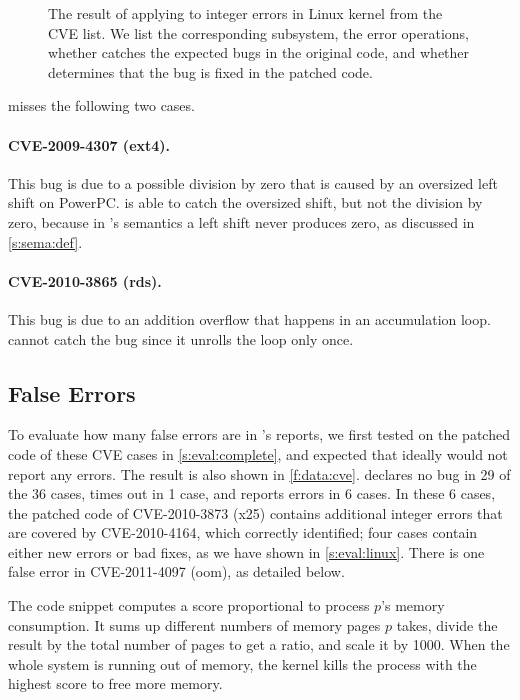 \begin{figure*}
\centering
\footnotesize

\caption{The result of applying \sys to integer errors in Linux
kernel from the CVE list.  We list the corresponding
subsystem, the error operations, whether \sys catches the expected
bugs in the original code, and whether \sys determines that the bug
is fixed in the patched code.}
\label{f:data:cve}
\end{figure*}

\sys misses the following two cases.

\paragraph{CVE-2009-4307 (ext4).}
This bug is due to a possible division by zero that is caused by
an oversized left shift on PowerPC\@.  \sys is able to catch the
oversized shift, but not the division by zero, because in \sys's
semantics a left shift never produces zero, as discussed in
\autoref{s:sema:def}.

\paragraph{CVE-2010-3865 (rds).}
This bug is due to an addition overflow that happens in an accumulation
loop.  \sys cannot catch the bug since it unrolls the loop only
once.

\subsection{False Errors}

To evaluate how many false errors are in \sys's reports,
we first tested \sys on the patched code of these CVE cases
in \autoref{s:eval:complete},
and expected that ideally \sys would not report any errors.
The result is also shown in \autoref{f:data:cve}.
\sys declares no bug in 29 of the 36 cases, times out in 1 case, and
reports errors in 6 cases.
%
In these 6 cases,
the patched code of CVE-2010-3873 (x25)
contains additional integer errors that are covered by CVE-2010-4164,
which \sys correctly identified;
four cases contain either new errors or bad fixes,
as we have shown in \autoref{s:eval:linux}.
There is one false error in CVE-2011-4097 (oom), as detailed below.


The code snippet
computes a score proportional to process $p$'s memory consumption.
It sums up different numbers of
memory pages $p$ takes, divide the result by the total number
of pages to get a ratio, and scale it by 1000.
When the whole system is running out of memory,
the kernel kills the process with the highest score
to free more memory.

